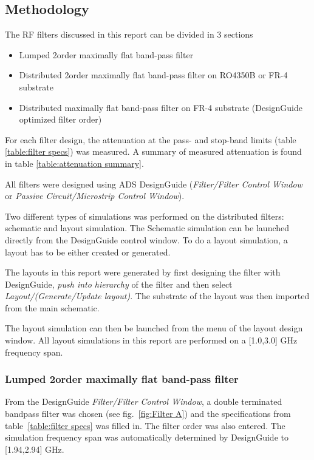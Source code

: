 \documentclass[report.tex]{subfiles}
\begin{document}
\subsection{Methodology}
The RF filters discussed in this report can be divided in 3 sections
\begin{itemize}
    \item Lumped 2\nd order maximally flat band-pass filter
    \item Distributed 2\nd order maximally flat band-pass filter on RO4350B or FR-4 substrate
    \item Distributed maximally flat band-pass filter on FR-4 substrate (DesignGuide optimized filter order)
\end{itemize}
For each filter design, the attenuation at the pass- and stop-band limits (table \ref{table:filter specs}) was measured. A summary of measured attenuation is found in table \ref{table:attenuation summary}.

All filters were designed using ADS DesignGuide (\emph{Filter/Filter Control Window} or \emph{Passive Circuit/Microstrip Control Window}).

Two different types of simulations was performed on the distributed filters: schematic and layout simulation. The Schematic simulation can be launched directly from the DesignGuide control window. To do a layout simulation, a layout has to be either created or generated.

The layouts in this report were generated by first designing the filter with DesignGuide, \emph{push into hierarchy} of the filter and then select \emph{Layout/(Generate/Update layout)}. The substrate of the layout was then imported from the main schematic.

The layout simulation can then be launched from the menu of the layout design window. All layout simulations in this report are performed on a [1.0,3.0] GHz frequency span.

\subsubsection{Lumped 2\nd order maximally flat band-pass filter}
From the DesignGuide \emph{Filter/Filter Control Window}, a double terminated bandpass filter was chosen (see fig.~\ref{fig:Filter A}) and the specifications from table~\ref{table:filter specs} was filled in. The filter order was also entered. The simulation frequency span was automatically determined by DesignGuide to [1.94,2.94] GHz.
\end{document}
